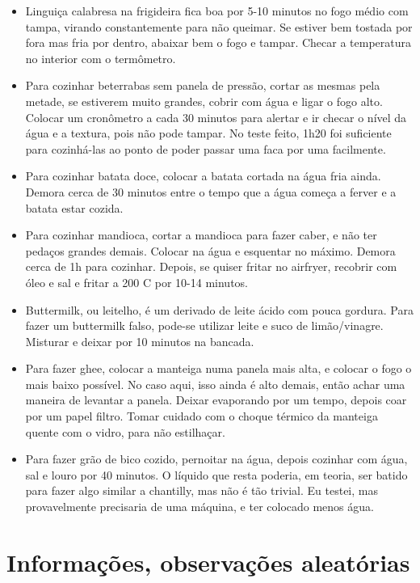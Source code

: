\begin{itemize}
	\item Linguiça calabresa na frigideira fica boa por 5-10 minutos no fogo médio com tampa, virando
	      constantemente para não queimar. Se estiver bem tostada por fora mas fria por dentro, abaixar bem o fogo e
	      tampar. Checar a temperatura no interior com o termômetro.
	\item Para cozinhar beterrabas sem panela de pressão, cortar as mesmas pela metade, se estiverem muito
	      grandes, cobrir com água e ligar o fogo alto. Colocar um cronômetro a cada 30 minutos para alertar e ir
	      checar o nível da água e a textura, pois não pode tampar. No teste feito, 1h20 foi suficiente para
	      cozinhá-las ao ponto de poder passar uma faca por uma facilmente.
	\item Para cozinhar batata doce, colocar a batata cortada na água fria ainda. Demora cerca de 30 minutos
	      entre o tempo que a água começa a ferver e a batata estar cozida.
	\item Para cozinhar mandioca, cortar a mandioca para fazer caber, e não ter pedaços grandes demais.
	      Colocar na água e esquentar no máximo. Demora cerca de 1h para cozinhar. Depois, se quiser fritar no
	      airfryer, recobrir com óleo e sal e fritar a 200 \grau C por 10-14 minutos.
	\item Buttermilk, ou leitelho, é um derivado de leite ácido com pouca gordura. Para fazer um buttermilk
	      falso, pode-se utilizar leite e suco de limão/vinagre. Misturar e deixar por 10 minutos na bancada.
	\item Para fazer ghee, colocar a manteiga numa panela mais alta, e colocar o fogo o mais baixo possível. No
	      caso aqui, isso ainda é alto demais, então achar uma maneira de levantar a panela. Deixar evaporando por
	      um tempo, depois coar por um papel filtro. Tomar cuidado com o choque térmico da manteiga quente com o
	      vidro, para não estilhaçar.
	\item Para fazer grão de bico cozido, pernoitar na água, depois cozinhar com água, sal e louro por 40
	      minutos. O líquido que resta poderia, em teoria, ser batido para fazer algo similar a chantilly, mas
	      não é tão trivial. Eu testei, mas provavelmente precisaria de uma máquina, e ter colocado menos água.
\end{itemize}
\clearpage

\section{Informações, observações aleatórias}


